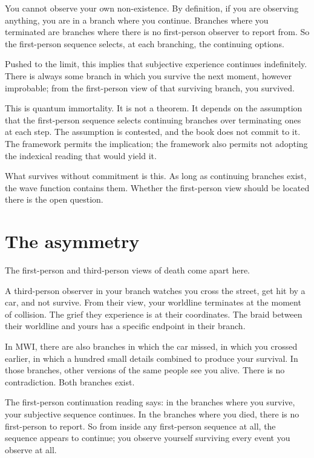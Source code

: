 You cannot observe your own non-existence. By definition, if you are observing anything, you are in a branch where you continue. Branches where you terminated are branches where there is no first-person observer to report from. So the first-person sequence selects, at each branching, the continuing options.

Pushed to the limit, this implies that subjective experience continues indefinitely. There is always some branch in which you survive the next moment, however improbable; from the first-person view of that surviving branch, you survived.

This is quantum immortality. It is not a theorem. It depends on the assumption that the first-person sequence selects continuing branches over terminating ones at each step. The assumption is contested, and the book does not commit to it. The framework permits the implication; the framework also permits not adopting the indexical reading that would yield it.

What survives without commitment is this. As long as continuing branches exist, the wave function contains them. Whether the first-person view should be located there is the open question.

\section*{The asymmetry}

The first-person and third-person views of death come apart here.

A third-person observer in your branch watches you cross the street, get hit by a car, and not survive. From their view, your worldline terminates at the moment of collision. The grief they experience is at their coordinates. The braid between their worldline and yours has a specific endpoint in their branch.

In MWI, there are also branches in which the car missed, in which you crossed earlier, in which a hundred small details combined to produce your survival. In those branches, other versions of the same people see you alive. There is no contradiction. Both branches exist.

The first-person continuation reading says: in the branches where you survive, your subjective sequence continues. In the branches where you died, there is no first-person to report. So from inside any first-person sequence at all, the sequence appears to continue; you observe yourself surviving every event you observe at all.

